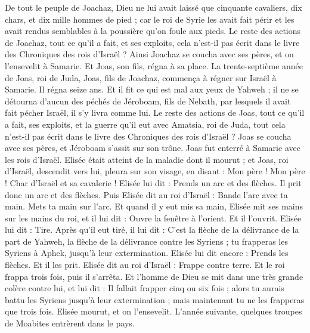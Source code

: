\begin{multicols}{2}
De tout le peuple de Joachaz, Dieu ne lui avait laissé que cinquante cavaliers, dix chars, et dix mille hommes de pied ; car le roi de Syrie les avait fait périr et les avait rendus semblables à la poussière qu'on foule aux pieds.
Le reste des actions de Joachaz, tout ce qu'il a fait, et ses exploits, cela n'est-il pas écrit dans le livre des Chroniques des rois d'Israël ?
Ainsi Joachaz se coucha avec ses pères, et on l'ensevelit à Samarie. Et Joas, son fils, régna à sa place.
La trente-septième année de Joas, roi de Juda, Joas, fils de Joachaz, commença à régner sur Israël à Samarie. Il régna seize ans.
Et il fit ce qui est mal aux yeux de Yahweh ; il ne se détourna d'aucun des péchés de Jéroboam, fils de Nebath, par lesquels il avait fait pécher Israël, il s'y livra comme lui.
Le reste des actions de Joas, tout ce qu'il a fait, ses exploits, et la guerre qu'il eut avec Amatsia, roi de Juda, tout cela n'est-il pas écrit dans le livre des Chroniques des rois d'Israël ?
Joas se coucha avec ses pères, et Jéroboam s'assit sur son trône. Joas fut enterré à Samarie avec les rois d'Israël.
Elisée était atteint de la maladie dont il mourut ; et Joas, roi d'Israël, descendit vers lui, pleura sur son visage, en disant : Mon père ! Mon père ! Char d'Israël et sa cavalerie !
Elisée lui dit : Prends un arc et des flèches. Il prit donc un arc et des flèches.
Puis Elisée dit au roi d'Israël : Bande l'arc avec ta main. Mets ta main sur l'arc. Et quand il y eut mis sa main, Elisée mit ses mains sur les mains du roi,
et il lui dit : Ouvre la fenêtre à l'orient. Et il l'ouvrit. Elisée lui dit : Tire. Après qu'il eut tiré, il lui dit : C'est la flèche de la délivrance de la part de Yahweh, la flèche de la délivrance contre les Syriens ; tu frapperas les Syriens à Aphek, jusqu'à leur extermination.
Elisée lui dit encore : Prends les flèches. Et il les prit. Elisée dit au roi d'Israël : Frappe contre terre. Et le roi frappa trois fois, puis il s'arrêta.
Et l'homme de Dieu se mit dans une très grande colère contre lui, et lui dit : Il fallait frapper cinq ou six fois ; alors tu aurais battu les Syriens jusqu'à leur extermination ; mais maintenant tu ne les frapperas que trois fois.
Elisée mourut, et on l'ensevelit. L'année suivante, quelques troupes de Moabites entrèrent dans le pays.

\end{multicols}
